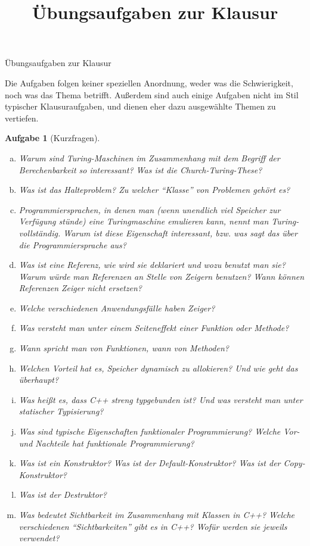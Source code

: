 \documentclass[a4paper,12pt,parskip=full]{scrartcl}
\title{Übungsaufgaben zur Klausur}
\theoremstyle{exercise}
\newtheorem{exercise}{Aufgabe}
\begin{document}
\begin{center}
  {\LARGE Übungsaufgaben zur Klausur} \\
\end{center}
Die Aufgaben folgen keiner speziellen Anordnung, weder
was die Schwierigkeit, noch was das Thema betrifft. Außerdem sind auch einige Aufgaben
nicht im Stil typischer \glqq{}Klausuraufgaben\grqq{}, und dienen eher dazu ausgewählte
Themen zu vertiefen.

\begin{exercise}[Kurzfragen]
\begin{enumerate}[a)]
\item Warum sind Turing-Maschinen im Zusammenhang mit dem Begriff der
  Berechenbarkeit so interessant? Was ist die Church-Turing-These?
\item Was ist das Halteproblem? Zu welcher ``Klasse'' von Problemen
  gehört es?
\item Programmiersprachen, in denen man (wenn unendlich viel Speicher
  zur Verfügung stünde) eine Turingmaschine emulieren kann, nennt man
  Turing-vollständig. Warum ist diese Eigenschaft interessant,
  bzw. was sagt das über die Programmiersprache aus?
\item Was ist eine Referenz, wie wird sie deklariert und wozu benutzt
  man sie? Warum würde man Referenzen an Stelle von Zeigern benutzen?
  Wann können Referenzen Zeiger nicht ersetzen?
\item Welche verschiedenen Anwendungsfälle haben Zeiger?
\item Was versteht man unter einem Seiteneffekt einer Funktion oder
  Methode?
\item Wann spricht man von Funktionen, wann von Methoden?
\item Welchen Vorteil hat es, Speicher dynamisch zu allokieren? Und
  wie geht das überhaupt?
\item Was heißt es, dass C++ streng typgebunden ist? Und was versteht
  man unter statischer Typisierung?
\item Was sind typische Eigenschaften funktionaler Programmierung?
  Welche Vor- und Nachteile hat funktionale Programmierung?
\item Was ist ein Konstruktor? Was ist der Default-Konstruktor? Was
  ist der Copy-Konstruktor?
\item Was ist der Destruktor?
\item Was bedeutet Sichtbarkeit im Zusammenhang mit Klassen in C++?
  Welche verschiedenen ``Sichtbarkeiten'' gibt es in C++? Wofür werden
  sie jeweils verwendet?

\end{enumerate}
\end{exercise}
\end{document}
